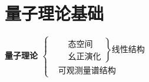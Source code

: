 \section{量子理论基础}
\begin{center}
\Large\textbf{量子理论
$\left\{
    \begin{aligned}
        &\left.
            \begin{aligned}
                &\text{态空间} \\
                &\text{幺正演化}
        \end{aligned}\right\}\text{线性结构}\\
        &\text{可观测量谱结构}
    \end{aligned}
\right.$
}

\end{center}

